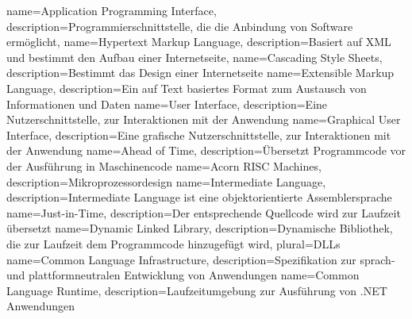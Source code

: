 {
	name={Application Programming Interface},
	description={Programmierschnittstelle, die die Anbindung von Software ermöglicht},
}
{
	name=Hypertext Markup Language,
	description={Basiert auf XML und bestimmt den Aufbau einer Internetseite},
}
{
	name=Cascading Style Sheets,
	description={Bestimmt das Design einer Internetseite}
}
{
	name=Extensible Markup Language,
	description={Ein auf Text basiertes Format zum Austausch von Informationen und Daten}
}
{
	name=User Interface,
	description={Eine Nutzerschnittstelle, zur Interaktionen mit der Anwendung}
}
{
	name=Graphical User Interface,
	description={Eine grafische Nutzerschnittstelle, zur Interaktionen mit der Anwendung}
}
{
	name=Ahead of Time,
	description={Übersetzt Programmcode vor der Ausführung in Maschinencode}
}
{
	name=Acorn RISC Machines,
	description={Mikroprozessordesign}
}
{
	name=Intermediate Language,
	description={Intermediate Language ist eine objektorientierte Assemblersprache}
}
{
	name=Just-in-Time,
	description={Der entsprechende Quellcode wird zur Laufzeit übersetzt}
}
{
	name=Dynamic Linked Library,
	description={Dynamische Bibliothek, die zur Laufzeit dem Programmcode hinzugefügt wird},
	plural=DLLs
}
{
	name=Common Language Infrastructure,
	description={Spezifikation zur sprach- und plattformneutralen Entwicklung von Anwendungen}
}
{
	name=Common Language Runtime,
	description={Laufzeitumgebung zur Ausführung von .NET Anwendungen}
}
